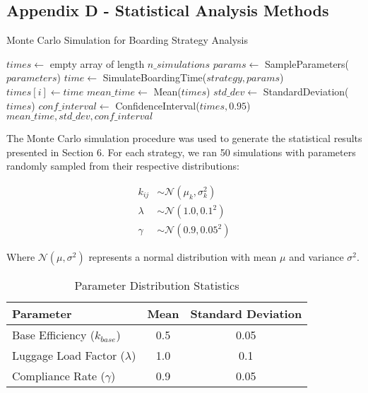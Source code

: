 \documentclass[12pt]{article}
\begin{document}
\subsection{Appendix D - Statistical Analysis Methods}

\begin{algorithm}[H]
\caption{Monte Carlo Simulation for Boarding Strategy Analysis}
\label{alg:monte_carlo}
\begin{algorithmic}[1]
    \State $times \gets$ empty array of length $n\_simulations$
        \State $params \gets$ SampleParameters($parameters$) 
        \State $time \gets$ SimulateBoardingTime($strategy, params$)
        \State $times[i] \gets time$
    \EndFor
    \State $mean\_time \gets$ Mean($times$)
    \State $std\_dev \gets$ StandardDeviation($times$)
    \State $conf\_interval \gets$ ConfidenceInterval($times, 0.95$)
    \State \Return $mean\_time, std\_dev, conf\_interval$
\EndProcedure
\end{algorithmic}
\end{algorithm}

The Monte Carlo simulation procedure was used to generate the statistical results presented in Section 6. For each strategy, we ran 50 simulations with parameters randomly sampled from their respective distributions:

\begin{align}
k_{ij} &\sim \mathcal{N}(\mu_{k}, \sigma_{k}^2) \\
\lambda &\sim \mathcal{N}(1.0, 0.1^2) \\
\gamma &\sim \mathcal{N}(0.9, 0.05^2)
\end{align}

Where $\mathcal{N}(\mu, \sigma^2)$ represents a normal distribution with mean $\mu$ and variance $\sigma^2$.

\begin{table}[h]
\centering
\caption{Parameter Distribution Statistics}
\begin{tabular}{lcc}
\toprule
\textbf{Parameter} & \textbf{Mean} & \textbf{Standard Deviation} \\
\midrule
Base Efficiency ($k_{base}$) & 0.5 & 0.05 \\
Luggage Load Factor ($\lambda$) & 1.0 & 0.1 \\
Compliance Rate ($\gamma$) & 0.9 & 0.05 \\
\bottomrule
\end{tabular}
\label{tab:parameter_distributions}
\end{table}
\end{document}
